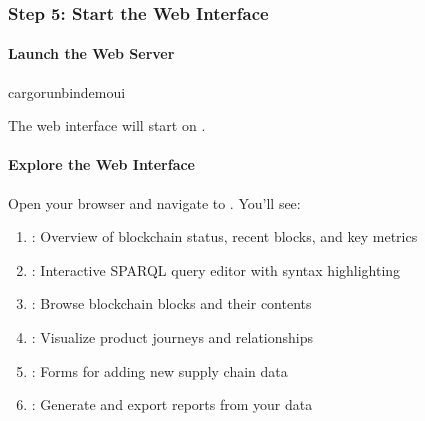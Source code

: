 \documentclass[letterpaper,10pt,english]{sphinxmanual}
\begin{document}
\subsubsection{Step 5: Start the Web Interface}
\label{\detokenize{user-guide/first-steps:step-5-start-the-web-interface}}

\paragraph{Launch the Web Server}
\label{\detokenize{user-guide/first-steps:launch-the-web-server}}
\begin{sphinxVerbatim}[commandchars=\\\{\}]
cargorun\PYGZhy{}\PYGZhy{}bindemo\PYGZus{}ui
\end{sphinxVerbatim}

\sphinxAtStartPar
The web interface will start on .


\paragraph{Explore the Web Interface}
\label{\detokenize{user-guide/first-steps:explore-the-web-interface}}
\sphinxAtStartPar
Open your browser and navigate to . You’ll see:
\begin{enumerate}
%
\item {} 
\sphinxAtStartPar
{}: Overview of blockchain status, recent blocks, and key metrics

\item {} 
\sphinxAtStartPar
{}: Interactive SPARQL query editor with syntax highlighting

\item {} 
\sphinxAtStartPar
{}: Browse blockchain blocks and their contents

\item {} 
\sphinxAtStartPar
{}: Visualize product journeys and relationships

\item {} 
\sphinxAtStartPar
{}: Forms for adding new supply chain data

\item {} 
\sphinxAtStartPar
{}: Generate and export reports from your data

\end{enumerate}
\end{document}
